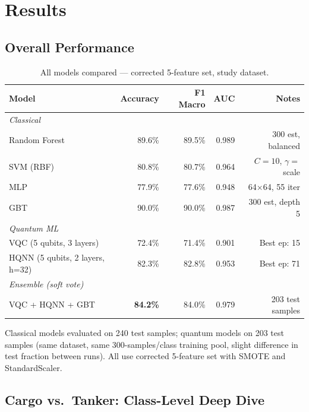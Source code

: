 \documentclass[journal]{IEEEtran}
\begin{document}
\section{Results}
\label{sec:results}

\subsection{Overall Performance}

\begin{table}[H]
\centering
\caption{All models compared — corrected 5-feature set, study dataset.}
\label{tab:all_results}
\begin{tabular}{lrrrr}
\toprule
\textbf{Model} & \textbf{Accuracy} & \textbf{F1 Macro} & \textbf{AUC} & \textbf{Notes} \\
\midrule
\multicolumn{5}{l}{\textit{Classical}} \\
Random Forest   & 89.6\% & 89.5\% & 0.989 & 300 est, balanced \\
SVM (RBF)       & 80.8\% & 80.7\% & 0.964 & $C=10$, $\gamma=$scale \\
MLP             & 77.9\% & 77.6\% & 0.948 & 64$\times$64, 55 iter \\
GBT             & 90.0\% & 90.0\% & 0.987 & 300 est, depth 5 \\
\midrule
\multicolumn{5}{l}{\textit{Quantum ML}} \\
VQC (5 qubits, 3 layers)           & 72.4\% & 71.4\% & 0.901 & Best ep: 15 \\
HQNN (5 qubits, 2 layers, h=32)    & 82.3\% & 82.8\% & 0.953 & Best ep: 71 \\
\midrule
\multicolumn{5}{l}{\textit{Ensemble (soft vote)}} \\
VQC + HQNN + GBT                   & \textbf{84.2\%} & 84.0\% & 0.979 & 203 test samples \\
\bottomrule
\end{tabular}
\end{table}

\noindent Classical models evaluated on 240 test samples; quantum models on 203
test samples (same dataset, same 300-samples/class training pool, slight
difference in test fraction between runs). All use corrected 5-feature set
with SMOTE and StandardScaler.

\subsection{Cargo vs.\ Tanker: Class-Level Deep Dive}
\end{document}
